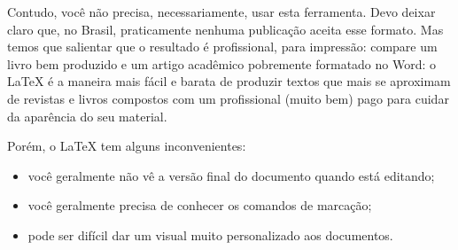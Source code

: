 \documentclass[a4paper,nols,bidi]{tufte-book}
\begin{document}


Contudo, você não precisa, necessariamente, usar esta ferramenta. Devo deixar claro que, no Brasil, praticamente nenhuma publicação aceita esse formato. Mas temos que salientar que o resultado é profissional, para impressão: compare um livro bem produzido e um artigo acadêmico pobremente formatado no Word: o \LaTeX{} é a maneira mais fácil e barata de produzir textos que mais se aproximam de revistas e livros compostos com um profissional (muito bem) pago para cuidar da aparência do seu material. 

Porém, o \LaTeX{} tem alguns inconvenientes:
 
\begin{itemize}

\item você geralmente não vê a versão final do documento quando está editando;
\item você geralmente precisa de conhecer os comandos de marcação;
\item pode ser difícil dar um visual muito personalizado aos documentos.
\end{itemize}
\end{document}
